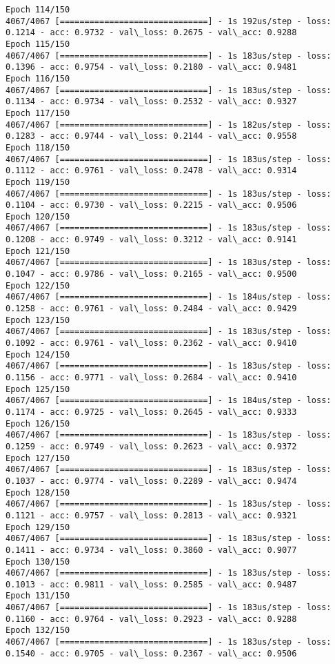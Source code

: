\documentclass[11pt]{article}
\begin{document}
\begin{Verbatim}[commandchars=\\\{\}]
Epoch 114/150
4067/4067 [==============================] - 1s 192us/step - loss: 0.1214 - acc: 0.9732 - val\_loss: 0.2675 - val\_acc: 0.9288
Epoch 115/150
4067/4067 [==============================] - 1s 183us/step - loss: 0.1396 - acc: 0.9754 - val\_loss: 0.2180 - val\_acc: 0.9481
Epoch 116/150
4067/4067 [==============================] - 1s 183us/step - loss: 0.1134 - acc: 0.9734 - val\_loss: 0.2532 - val\_acc: 0.9327
Epoch 117/150
4067/4067 [==============================] - 1s 182us/step - loss: 0.1283 - acc: 0.9744 - val\_loss: 0.2144 - val\_acc: 0.9558
Epoch 118/150
4067/4067 [==============================] - 1s 183us/step - loss: 0.1112 - acc: 0.9761 - val\_loss: 0.2478 - val\_acc: 0.9314
Epoch 119/150
4067/4067 [==============================] - 1s 183us/step - loss: 0.1104 - acc: 0.9730 - val\_loss: 0.2215 - val\_acc: 0.9506
Epoch 120/150
4067/4067 [==============================] - 1s 183us/step - loss: 0.1208 - acc: 0.9749 - val\_loss: 0.3212 - val\_acc: 0.9141
Epoch 121/150
4067/4067 [==============================] - 1s 183us/step - loss: 0.1047 - acc: 0.9786 - val\_loss: 0.2165 - val\_acc: 0.9500
Epoch 122/150
4067/4067 [==============================] - 1s 184us/step - loss: 0.1258 - acc: 0.9761 - val\_loss: 0.2484 - val\_acc: 0.9429
Epoch 123/150
4067/4067 [==============================] - 1s 183us/step - loss: 0.1092 - acc: 0.9761 - val\_loss: 0.2362 - val\_acc: 0.9410
Epoch 124/150
4067/4067 [==============================] - 1s 183us/step - loss: 0.1156 - acc: 0.9771 - val\_loss: 0.2684 - val\_acc: 0.9410
Epoch 125/150
4067/4067 [==============================] - 1s 184us/step - loss: 0.1174 - acc: 0.9725 - val\_loss: 0.2645 - val\_acc: 0.9333
Epoch 126/150
4067/4067 [==============================] - 1s 183us/step - loss: 0.1259 - acc: 0.9749 - val\_loss: 0.2623 - val\_acc: 0.9372
Epoch 127/150
4067/4067 [==============================] - 1s 183us/step - loss: 0.1037 - acc: 0.9774 - val\_loss: 0.2289 - val\_acc: 0.9474
Epoch 128/150
4067/4067 [==============================] - 1s 183us/step - loss: 0.1121 - acc: 0.9757 - val\_loss: 0.2813 - val\_acc: 0.9321
Epoch 129/150
4067/4067 [==============================] - 1s 183us/step - loss: 0.1411 - acc: 0.9734 - val\_loss: 0.3860 - val\_acc: 0.9077
Epoch 130/150
4067/4067 [==============================] - 1s 183us/step - loss: 0.1013 - acc: 0.9811 - val\_loss: 0.2585 - val\_acc: 0.9487
Epoch 131/150
4067/4067 [==============================] - 1s 183us/step - loss: 0.1160 - acc: 0.9764 - val\_loss: 0.2923 - val\_acc: 0.9288
Epoch 132/150
4067/4067 [==============================] - 1s 183us/step - loss: 0.1540 - acc: 0.9705 - val\_loss: 0.2367 - val\_acc: 0.9506

\end{Verbatim}
\end{document}
